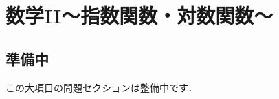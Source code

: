 \documentclass[../../ms_q.tex]{subfiles}
\begin{document}
\section{数学II～指数関数・対数関数～}

\subsection*{準備中}
この大項目の問題セクションは整備中です．
\end{document}
